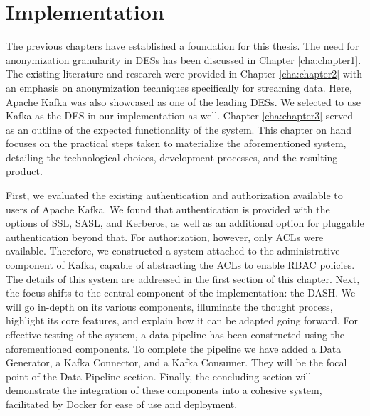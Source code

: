\chapter{Implementation\label{cha:chapter4}}
The previous chapters have established a foundation for this thesis. The need for anonymization granularity in \acp{DES} has been discussed in Chapter \ref{cha:chapter1}. The existing literature and research were provided in Chapter \ref{cha:chapter2} with an emphasis on anonymization techniques specifically for streaming data. Here, Apache Kafka was also showcased as one of the leading \acp{DES}. We selected to use Kafka as the \ac{DES} in our implementation as well. Chapter \ref{cha:chapter3} served as an outline of the expected functionality of the system. This chapter on hand focuses on the practical steps taken to materialize the aforementioned system, detailing the technological choices, development processes, and the resulting product. \par
First, we evaluated the existing authentication and authorization available to users of Apache Kafka. We found that authentication is provided with the options of SSL, SASL, and Kerberos, as well as an additional option for pluggable authentication beyond that. For authorization, however, only \acp{ACL} were available. Therefore, we constructed a system attached to the administrative component of Kafka, capable of abstracting the \acp{ACL} to enable \ac{RBAC} policies. The details of this system are addressed in the first section of this chapter. Next, the focus shifts to the central component of the implementation: the \acf{DASH}. We will go in-depth on its various components, illuminate the thought process, highlight its core features, and explain how it can be adapted going forward. For effective testing of the system, a data pipeline has been constructed using the aforementioned components. To complete the pipeline we have added a Data Generator, a Kafka Connector, and a Kafka Consumer. They will be the focal point of the Data Pipeline section. Finally, the concluding section will demonstrate the integration of these components into a cohesive system, facilitated by Docker for ease of use and deployment.
\newpage

